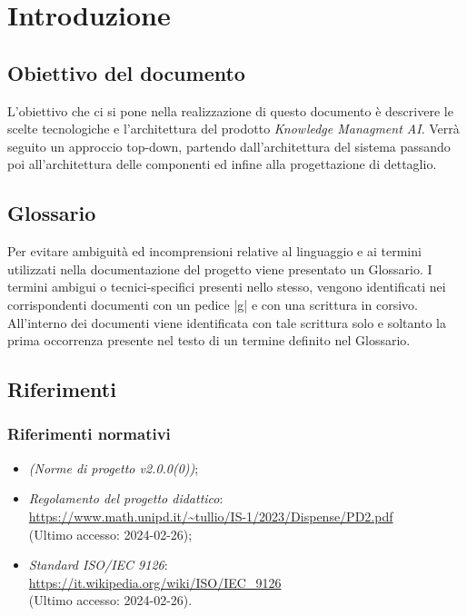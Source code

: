 \documentclass[10pt, a4paper]{article}
\title{\titolo}
\author{SWEetCode}
\begin{document}



\newpage

\tableofcontents
\newpage
\listoffigures
\newpage
\listoftables
\newpage

\section{Introduzione}
\subsection{Obiettivo del documento}
L'obiettivo che ci si pone nella realizzazione di questo documento è descrivere le scelte tecnologiche e l'architettura del prodotto \textit{Knowledge Managment AI}. Verrà seguito un approccio top-down, partendo dall'architettura del sistema passando poi all'architettura delle componenti ed infine alla progettazione di dettaglio.

\subsection{Glossario}
Per evitare ambiguità ed incomprensioni relative al linguaggio e ai termini utilizzati nella documentazione del progetto viene presentato un Glossario.
I termini ambigui o tecnici-specifici presenti nello stesso, vengono identificati nei corrispondenti documenti con un pedice |g| e con una scrittura in corsivo.
All'interno dei documenti viene identificata con tale scrittura solo e soltanto la prima occorrenza presente nel testo di un termine definito nel Glossario.

\subsection{Riferimenti}
   \subsubsection{Riferimenti normativi}
   \begin{itemize}
    \item \textit{(Norme di progetto v2.0.0(0))};
    \item \textit{Regolamento del progetto didattico}: \\
        \url{https://www.math.unipd.it/~tullio/IS-1/2023/Dispense/PD2.pdf}\\
        (Ultimo accesso: 2024-02-26);
    \item \textit{Standard ISO/IEC 9126}:\\
        \url{https://it.wikipedia.org/wiki/ISO/IEC_9126}\\
        (Ultimo accesso: 2024-02-26).
    \end{itemize}
    
\end{document}
